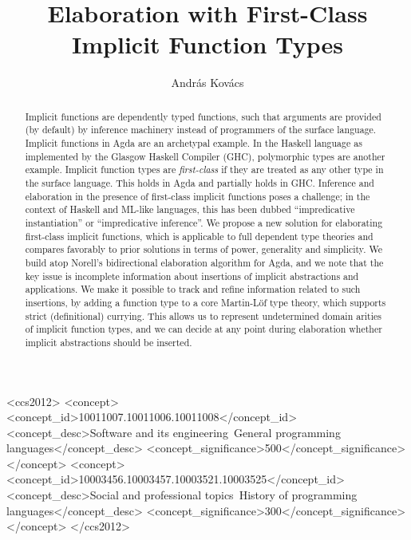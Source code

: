 \documentclass[acmsmall,review,anonymous,prologue,dvipsnames]{acmart}\settopmatter{printfolios=true,printccs=false,printacmref=false}
\theoremstyle{remark}
\begin{document}
\title{Elaboration with First-Class Implicit Function Types}


\author{Andr{\'a}s Kov{\'a}cs}


\begin{abstract}
Implicit functions are dependently typed functions, such that arguments are
provided (by default) by inference machinery instead of programmers of the
surface language. Implicit functions in Agda are an archetypal example. In the
Haskell language as implemented by the Glasgow Haskell Compiler (GHC),
polymorphic types are another example. Implicit function types are
\emph{first-class} if they are treated as any other type in the surface
language. This holds in Agda and partially holds in GHC. Inference and
elaboration in the presence of first-class implicit functions poses a challenge;
in the context of Haskell and ML-like languages, this has been dubbed
``impredicative instantiation'' or ``impredicative inference''. We propose a new
solution for elaborating first-class implicit functions, which is applicable
to full dependent type theories and compares favorably to prior solutions in
terms of power, generality and simplicity. We build atop Norell's
bidirectional elaboration algorithm for Agda, and we note that the key issue is
incomplete information about insertions of implicit abstractions and
applications. We make it possible to track and refine information related to
such insertions, by adding a function type to a core Martin-L\"of type theory,
which supports strict (definitional) currying. This allows us to represent
undetermined domain arities of implicit function types, and we can decide at any
point during elaboration whether implicit abstractions should be inserted.
\end{abstract}


\begin{CCSXML}
<ccs2012>
<concept>
<concept_id>10011007.10011006.10011008</concept_id>
<concept_desc>Software and its engineering~General programming languages</concept_desc>
<concept_significance>500</concept_significance>
</concept>
<concept>
<concept_id>10003456.10003457.10003521.10003525</concept_id>
<concept_desc>Social and professional topics~History of programming languages</concept_desc>
<concept_significance>300</concept_significance>
</concept>
</ccs2012>
\end{CCSXML}
\end{document}
